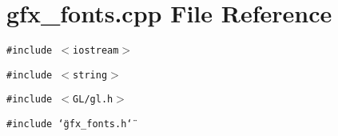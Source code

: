 \section{gfx\_\-fonts.cpp File Reference}
\label{gfx__fonts_8cpp}
{\tt \#include $<$iostream$>$}\par
{\tt \#include $<$string$>$}\par
{\tt \#include $<$GL/gl.h$>$}\par
{\tt \#include \char`\"{}gfx\_\-fonts.h\char`\"{}}\par

